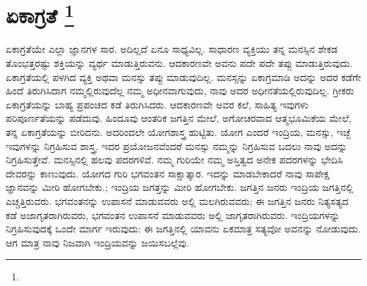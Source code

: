 
\vspace{-0.7cm}

\chapter[ಏಕಾಗ್ರತೆ ]{ಏಕಾಗ್ರತೆ \protect\footnote{}}

ಏಕಾಗ್ರತೆಯೇ ಎಲ್ಲಾ ಜ್ಞಾನಗಳ ಸಾರ. ಅದಿಲ್ಲದೆ ಏನೂ ಸಾಧ್ಯವಿಲ್ಲ. ಸಾಧಾರಣ ವ್ಯಕ್ತಿಯು ತನ್ನ ಮನಸ್ಸಿನ ಶೇಕಡ ತೊಂಭತ್ತರಷ್ಟು ಶಕ್ತಿಯನ್ನು ವ್ಯರ್ಥ ಮಾಡುತ್ತಿರುವನು. ಆದ\-ಕಾರಣವೇ ಅವನು ಪದೇ ಪದೇ ತಪ್ಪು ಮಾಡುತ್ತಿರುವುದು. ಏಕಾಗ್ರತೆಯಲ್ಲಿ ಪಳಗಿದ ವ್ಯಕ್ತಿ ಅಥವಾ ಮನಸ್ಸು ತಪ್ಪು ಮಾಡುವುದಿಲ್ಲ. ಮನಸ್ಸನ್ನು ಏಕಾಗ್ರಮಾಡಿ ಅದನ್ನು ಅದರ ಕಡೆಗೇ ಹಿಂದೆ ತಿರುಗಿಸಿದಾಗ ನಮ್ಮಲ್ಲಿರುವುದೆಲ್ಲ ನಮ್ಮ ಅಧೀನವಾಗುವುದು, ನಾವು ಅದರ ಅಧೀನತೆಯಲ್ಲಿರುವುದಿಲ್ಲ. ಗ್ರೀಕರು ಏಕಾಗ್ರತೆಯನ್ನು ಬಾಹ್ಯ ಪ್ರಪಂಚದ ಕಡೆ ತಿರುಗಿಸಿದರು. ಆದಕಾರಣವೇ ಅವರ ಕಲೆ, ಸಾಹಿತ್ಯ ಇವುಗಳು ಪರಿಪೂರ್ಣತೆಯನ್ನು ಪಡೆದುವು. ಹಿಂದೂವು ಆಂತರಿಕ ಜಗತ್ತಿನ ಮೇಲೆ, ಅಗೋಚರವಾದ ಆತ್ಮಭೂಮಿಕೆಯ ಮೇಲೆ, ತನ್ನ ಏಕಾಗ್ರತೆಯನ್ನು ಬೀರಿದನು. ಅದರಿಂದಲೇ ಯೋಗಶಾಸ್ತ್ರ ಹುಟ್ಟಿತು. ಯೋಗ ಎಂದರೆ ಇಂದ್ರಿಯ, ಮನಸ್ಸು, ಇಚ್ಛೆ ಇವುಗಳನ್ನು ನಿಗ್ರಹಿಸುವ ಶಾಸ್ತ್ರ. ಇದರ ಪ್ರಯೋಜನವೆಂದರೆ ಮನಸ್ಸು ನಮ್ಮನ್ನು ನಿಗ್ರಹಿಸುವ ಬದಲು ನಾವು ಅದನ್ನು ನಿಗ್ರಹಿಸುತ್ತೇವೆ. ಮನಸ್ಸಿನಲ್ಲಿ ಹಲವು ಪದರಗಳಿವೆ. ನಮ್ಮ ಗುರಿಯೇ ನಮ್ಮ ಅಸ್ತಿತ್ವದ ಅನೇಕ ಪದರಗಳನ್ನು ಭೇದಿಸಿ ದೇವರನ್ನು ಕಾಣುವುದು. ಯೋಗದ ಗುರಿ ಭಗವಂತನ ಸಾಕ್ಷಾತ್ಕಾರ. ಇದನ್ನು ಮಾಡಬೇಕಾದರೆ ನಾವು ಸಾಪೇಕ್ಷ ಜ್ಞಾನವನ್ನು ಮೀರಿ ಹೋಗಬೇಕು.; ಇಂದ್ರಿಯ ಜಗತ್ತನ್ನು ಮೀರಿ ಹೋಗಬೇಕು. ಜಗತ್ತಿನ ಜನರು ಇಂದ್ರಿಯ ಜಗತ್ತಿನಲ್ಲಿ ಎಚ್ಚತ್ತಿರುವರು. ಭಗವಂತನನ್ನು ಉಪಾಸನೆ ಮಾಡುವವರು ಅಲ್ಲಿ ಮಲಗಿರುವವರು; ಈ ಜಗತ್ತಿನ ಜನರು ನಿತ್ಯಸತ್ಯದ ಕಡೆ ಅಜಾಗೃತರಾಗಿರುವರು, ಭಗವಂತನ ಉಪಾಸನೆ ಮಾಡುವವರು ಅಲ್ಲಿ ಜಾಗೃತರಾಗಿರುವರು. ಇಂದ್ರಿಯಗಳನ್ನು ನಿಗ್ರಹಿಸುವುದಕ್ಕೆ ಒಂದೇ ಮಾರ್ಗ ಇರುವುದು: ಈ ಜಗತ್ತಿನಲ್ಲಿ ಯಾವನು ಏಕಮಾತ್ರ ಸತ್ಯವೋ ಅವನನ್ನು ನೋಡುವುದು. ಆಗ ಮಾತ್ರ ನಾವು ನಿಜವಾಗಿ ಇಂದ್ರಿಯವನ್ನು ಜಯಿಸಬಲ್ಲೆವು.

